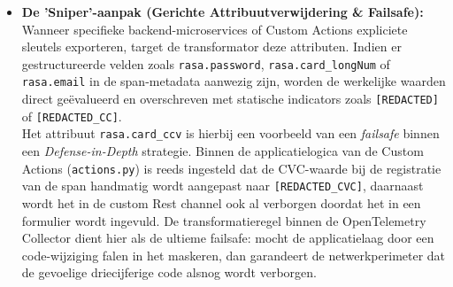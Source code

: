 \begin{itemize}
    \item \textbf{De 'Sniper'-aanpak (Gerichte Attribuutverwijdering \& Failsafe):} 
    Wanneer specifieke backend-microservices of Custom Actions expliciete sleutels exporteren, target de transformator deze attributen. Indien er gestructureerde velden zoals \texttt{rasa.password}, \texttt{rasa.card\_longNum} of \texttt{rasa.email} in de span-metadata aanwezig zijn, worden de werkelijke waarden direct geëvalueerd en overschreven met statische indicators zoals \texttt{[REDACTED]} of \texttt{[REDACTED\_CC]}.\\
    
    Het attribuut \texttt{rasa.card\_ccv} is hierbij een voorbeeld van een \textit{failsafe} binnen een \textit{Defense-in-Depth} strategie. Binnen de applicatielogica van de Custom Actions (\texttt{actions.py}) is reeds ingesteld dat de CVC-waarde bij de registratie van de span handmatig wordt aangepast naar \texttt{[REDACTED\_CVC]}, daarnaast wordt het in de custom Rest channel ook al verborgen doordat het in een formulier wordt ingevuld. De transformatieregel binnen de OpenTelemetry Collector dient hier als de ultieme failsafe: mocht de applicatielaag door een code-wijziging falen in het maskeren, dan garandeert de netwerkperimeter dat de gevoelige driecijferige code alsnog wordt verborgen.
    

\end{itemize}
